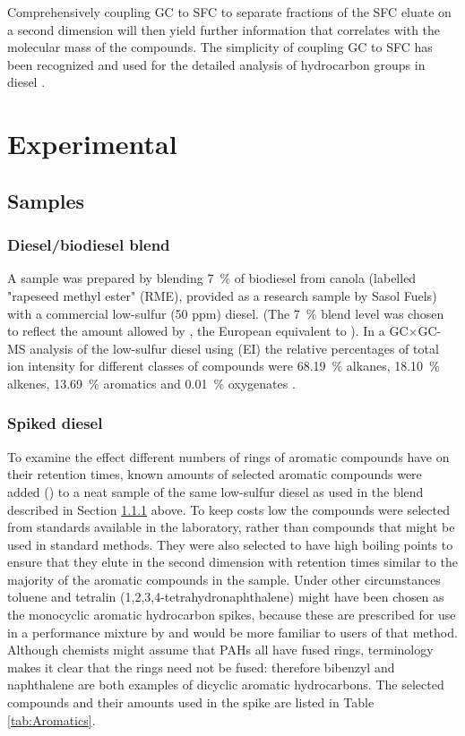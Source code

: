 Comprehensively coupling GC to SFC to separate fractions of the SFC eluate on a
second dimension will then yield further information that correlates with the
molecular mass of the compounds. The simplicity of coupling GC to SFC has been
recognized and used for the detailed analysis of hydrocarbon groups in diesel
\autocite{Pal1998}.


\section{Experimental}

\subsection{Samples} 

\subsubsection{Diesel/biodiesel blend}
\label{sec:SampleBlend}
A sample was prepared by blending \SI{7}{\percent} of biodiesel from canola
(labelled "rapeseed methyl ester" (RME), provided as a research sample by Sasol
Fuels) with a commercial low-sulfur (50 ppm) diesel. (The \SI{7}{\percent} blend
level was chosen to reflect the amount allowed by , the European
equivalent to ). In a GC×GC-MS analysis of the low-sulfur diesel
using  (EI) the relative percentages of total ion
intensity for different classes of compounds were \SI{68.19}{\percent} alkanes,
\SI{18.10}{\percent} alkenes, \SI{13.69}{\percent} aromatics and
\SI{0.01}{\percent} oxygenates \autocite{Smit2015}.

\subsubsection{Spiked diesel}
To examine the effect different numbers of rings of aromatic compounds have on
their retention times, known amounts of selected aromatic compounds were added
() to a neat sample of the same low-sulfur diesel as used in the
blend described in Section \ref{sec:SampleBlend} above. To keep costs low the
compounds were selected from standards available in the laboratory, rather than
compounds that might be used in standard methods. They were also selected to
have high boiling points to ensure that they elute in the second dimension with
retention times similar to the majority of the aromatic compounds in the sample.
Under other circumstances toluene and tetralin (1,2,3,4-tetrahydronaphthalene)
might have been chosen as the monocyclic aromatic hydrocarbon spikes, because
these are prescribed for use in a performance mixture by  and
would be more familiar to users of that method. Although chemists might assume
that PAHs all have fused rings,  terminology makes it clear that
the rings need not be fused: therefore bibenzyl and naphthalene are both
examples of dicyclic aromatic hydrocarbons. The selected compounds and their
amounts used in the spike are listed in Table \ref{tab:Aromatics}.

